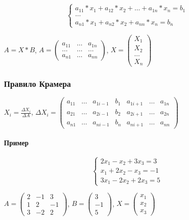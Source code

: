 \documentclass{article}
\begin{document}
\begin{flushleft}
\begin{equation}
    \begin{cases}
        a_{11} * x_1 + a_{12} * x_2 + \dots + a_{1 n} * x_{n} = b_1 \\
        \dots \\
        a_{n 1} * x_1 + a_{n 2} * x_2 + a_{n n} * x_n = b_n
    \end{cases}
\end{equation}

$A = X * B$, $A = \begin{pmatrix}
    a_{11} & \dots & a_{1 n} \\
    \dots & \dots & \dots \\
    a_{n 1} & \dots & a_{n n}
\end{pmatrix}$, $X = \begin{pmatrix}
    X_1 \\
    X_2 \\
    \dots \\
    X_n
\end{pmatrix}$

\subsubsection{Правило Крамера}

$X_{i} = \frac{\Delta X_i}{\Delta A}$, $\Delta X_{i} = \begin{pmatrix}
    a_{11} & \dots & a_{1 i - 1} & b_1 & a_{1 i + 1} &\dots &  a_{1 n} \\
    a_{21} & \dots & a_{2 i - 1} & b_2 & a_{2i + 1} & \dots & a_{2 n} \\
    a_{n 1} & \dots & a_{n i - 1} & b_n & a_{n i + 1} & \dots & a_{n n}
\end{pmatrix}$

\paragraph{Пример}

\begin{equation}
    \begin{cases}
        2x_1 - x_2 + 3x_3 = 3 \\
        x_1 + 2x_2 - x_3 = -1 \\
        3x_1 - 2x_2 + 2x_3 = 5
    \end{cases}
\end{equation}

$A = \begin{pmatrix}
    2 & -1 & 3 \\
    1 & 2 & -1 \\
    3 & -2 & 2
\end{pmatrix}$, $B = \begin{pmatrix}
    3 \\
    -1 \\
    5
\end{pmatrix}$, $X = \begin{pmatrix}
    x_1 \\
    x_2 \\
    x_3
\end{pmatrix}$


\end{flushleft}
\end{document}
